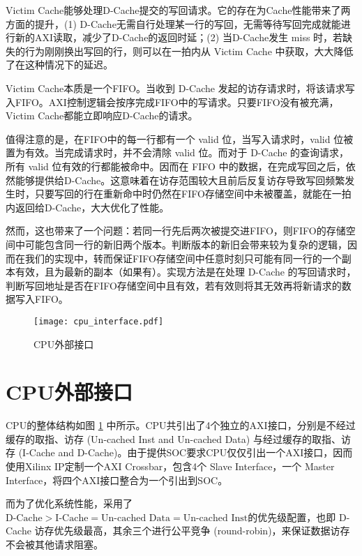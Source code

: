 Victim Cache能够处理D-Cache提交的写回请求。它的存在为Cache性能带来了两方面的提升，(1) D-Cache无需自行处理某一行的写回，无需等待写回完成就能进行新的AXI读取，减少了D-Cache的返回时延；(2) 当D-Cache发生 miss 时，若缺失的行为刚刚换出写回的行，则可以在一拍内从 Victim Cache 中获取，大大降低了在这种情况下的延迟。

Victim Cache本质是一个FIFO。当收到 D-Cache 发起的访存请求时，将该请求写入FIFO。AXI控制逻辑会按序完成FIFO中的写请求。只要FIFO没有被充满，Victim Cache都能立即响应D-Cache的请求。

值得注意的是，在FIFO中的每一行都有一个 valid 位，当写入请求时，valid 位被置为有效。当完成请求时，并不会清除 valid 位。而对于 D-Cache 的查询请求，所有 valid 位有效的行都能被命中。因而在 FIFO 中的数据，在完成写回之后，依然能够提供给D-Cache。这意味着在访存范围较大且前后反复访存导致写回频繁发生时，只要写回的行在重新命中时仍然在FIFO存储空间中未被覆盖，就能在一拍内返回给D-Cache，大大优化了性能。

然而，这也带来了一个问题：若同一行先后两次被提交进FIFO，则FIFO的存储空间中可能包含同一行的新旧两个版本。判断版本的新旧会带来较为复杂的逻辑，因而在我们的实现中，转而保证FIFO存储空间中任意时刻只可能有同一行的一个副本有效，且为最新的副本（如果有）。实现方法是在处理 D-Cache 的写回请求时，判断写回地址是否在FIFO存储空间中且有效，若有效则将其无效再将新请求的数据写入FIFO。

\begin{figure}[t]
	\centering
	\texttt{[image: cpu\_interface.pdf]}
	\caption{CPU外部接口}
	\label{fig:cpu-interface}
\end{figure}

\section{CPU外部接口}

CPU的整体结构如图 \ref{fig:cpu-interface} 中所示。CPU共引出了4个独立的AXI接口，分别是不经过缓存的取指、访存 (Un-cached Inst and Un-cached Data) 与经过缓存的取指、访存 (I-Cache and D-Cache)。由于提供SOC要求CPU仅仅引出一个AXI接口，因而使用Xilinx IP定制一个AXI Crossbar，包含4个 Slave Interface，一个 Master Interface，将四个AXI接口整合为一个引出到SOC。

而为了优化系统性能，采用了 \( \text{D-Cache} > \text{I-Cache} = \text{Un-cached Data} = \text{Un-cached Inst} \)的优先级配置，也即 D-Cache 访存优先级最高，其余三个进行公平竞争 (round-robin)，来保证数据访存不会被其他请求阻塞。


	